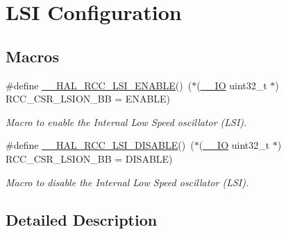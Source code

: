 \hypertarget{group___r_c_c___l_s_i___configuration}{\section{L\-S\-I Configuration}
\label{group___r_c_c___l_s_i___configuration}
}
\subsection*{Macros}
\begin{DoxyCompactItemize}
\item 
\#define \hyperlink{group___r_c_c___l_s_i___configuration_ga560de8b8991db4a296de878a7a8aa58b}{\-\_\-\-\_\-\-H\-A\-L\-\_\-\-R\-C\-C\-\_\-\-L\-S\-I\-\_\-\-E\-N\-A\-B\-L\-E}()~($\ast$(\hyperlink{core__sc300_8h_aec43007d9998a0a0e01faede4133d6be}{\-\_\-\-\_\-\-I\-O} uint32\-\_\-t $\ast$) R\-C\-C\-\_\-\-C\-S\-R\-\_\-\-L\-S\-I\-O\-N\-\_\-\-B\-B = E\-N\-A\-B\-L\-E)
\begin{DoxyCompactList}\small\item\em Macro to enable the Internal Low Speed oscillator (L\-S\-I). \end{DoxyCompactList}\item 
\#define \hyperlink{group___r_c_c___l_s_i___configuration_ga4f96095bb4acda60b7f66d5d927da181}{\-\_\-\-\_\-\-H\-A\-L\-\_\-\-R\-C\-C\-\_\-\-L\-S\-I\-\_\-\-D\-I\-S\-A\-B\-L\-E}()~($\ast$(\hyperlink{core__sc300_8h_aec43007d9998a0a0e01faede4133d6be}{\-\_\-\-\_\-\-I\-O} uint32\-\_\-t $\ast$) R\-C\-C\-\_\-\-C\-S\-R\-\_\-\-L\-S\-I\-O\-N\-\_\-\-B\-B = D\-I\-S\-A\-B\-L\-E)
\begin{DoxyCompactList}\small\item\em Macro to disable the Internal Low Speed oscillator (L\-S\-I). \end{DoxyCompactList}\end{DoxyCompactItemize}


\subsection{Detailed Description}


